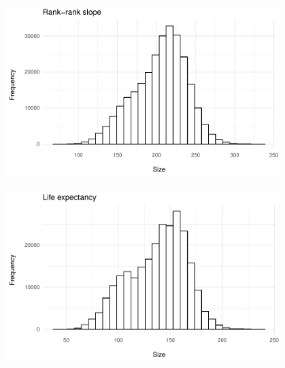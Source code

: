 \begin{figure}[htp]
    \caption{Cohort size to estimate county's rank-rank slope and life expectancy (30 replicates)}\vspace{5mm}
    \label{ch04:measurement_verification}
     \centering
     \begin{subfigure}[b]{0.50\textwidth}
         \centering
         \includegraphics[width=\textwidth]{plots/verification/measurement/im_cohort_size.pdf}
     \end{subfigure}%
     \begin{subfigure}[b]{0.50\textwidth}
         \centering
         \includegraphics[width=\textwidth]{plots/verification/measurement/mortality_cohort_size.pdf}
     \end{subfigure}\vspace{7mm}
\end{figure}
